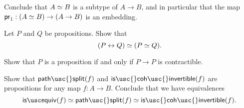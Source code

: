 \begin{exercises}
\begin{subexenum}
\end{subexenum}
Conclude that $\eqv{A}{B}$ is a subtype of $A\to B$, and in particular that the map $\proj 1 : (\eqv{A}{B})\to (A\to B)$ is an embedding.
\item \label{ex:prop_equiv}
\begin{subexenum}
\item \label{ex:equiv-bi-implication}Let $P$ and $Q$ be propositions. Show that
\begin{equation*}
\eqv{(P\leftrightarrow Q)}{(\eqv{P}{Q})}.
\end{equation*}
\item Show that $P$ is a proposition if and only if $P\to P$ is contractible.
\end{subexenum}
\item Show that $\mathsf{path\usc{}split}(f)$ and $\mathsf{is\usc{}coh\usc{}invertible}(f)$ are propositions for any map $f:A\to B$. Conclude that we have equivalences
  \begin{equation*}
    \isequiv(f) \eqvsym \mathsf{path\usc{}split}(f) \eqvsym \mathsf{is\usc{}coh\usc{}invertible}(f).
  \end{equation*}

\end{exercises}
